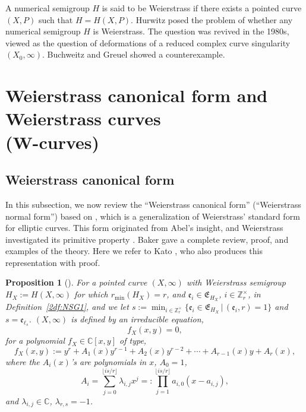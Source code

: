 \documentclass[pdftex]{sigma}
\def\CC{{\mathbb C}}
\def\ZZ{{\mathbb Z}}
\def\fE{{\mathfrak E}}
\def\fe{{\mathfrak e}}
\numberwithin{equation}{section}
\newtheorem{Proposition}[Theorem]{Proposition}
 { \theoremstyle{definition}
\newtheorem{Definition}[Theorem]{Definition}
\newtheorem{Note}[Theorem]{Note}
\newtheorem{Example}[Theorem]{Example}
\newtheorem{Remark}[Theorem]{Remark} }
\begin{document}
A numerical semigroup $H$ is said to be Weierstrass if there exists a pointed curve $(X, P)$ such that $H=H(X,P)$.
Hurwitz posed the problem of whether any numerical semigroup $H$ is Weierstrass.
The question was revived in the 1980s, viewed as the question of deformations of a reduced complex curve singularity $(X_0,\infty )$.
Buchweitz and Greuel showed a counterexample.

\section[Weierstrass canonical form and Weierstrass curves (W-curves)]{Weierstrass canonical form and Weierstrass curves\\ (W-curves)}\label{sec:WCF}

\subsection{Weierstrass canonical form}

In this subsection, we now review the ``Weierstrass canonical form'' (``Weierstrass normal form'') based on \cite{KM2020, KMP16, KMP19}, which is a generalization of Weierstrass' standard form for elliptic curves.
This form originated from Abel's insight, and Weierstrass investigated its primitive property \cite{Wei67, WeiWIV}.
Baker \cite[Chapter~V, Sections~60--79]{Baker97} gave a complete review, proof, and examples of the theory.
Here we refer to Kato \cite{CoppensKato, Kato80}, who also produces this representation with proof.

\begin{Proposition}[{\cite{CoppensKato, Kato80}}] \label{2pr:WCF}
For a pointed curve $(X,\infty )$ with Weierstrass semigroup $H_X:=H(X,\infty)$
for which $r_{\min}(H_X)=r$, and $\fe_i\in \fE_{H_X}$, $i \in \ZZ_r^\times$, in Definition~{\rm \ref{2df:NSG1}}, and we let
$s:=\min_{i\in \ZZ_r^\times}\{\fe_i \in \fE_{H_X}\, |\, (\fe_i, r)=1\}$ and $s=\fe_{\ell_s}$. $(X,\infty)$ is defined by an irreducible equation,
\begin{equation}
f_X(x,y)= 0,
\label{2eq:WCF1a}
\end{equation}
for a polynomial $f_X\in \CC[x,y]$ of type,
\begin{equation}
f_X(x,y):=y^r + A_{1}(x) y^{r-1}
+ A_{2}(x) y^{r-2}
+\cdots + A_{r-1}(x) y
 + A_{r}(x),
\label{2eq:WCF1b}
\end{equation}
where the $A_i(x)$'s are polynomials in $x$, $A_0=1$,
\begin{equation*}
A_i = \sum_{j=0}^{\lfloor i s/r\rfloor} \lambda_{i, j} x^j=:\prod_{j=1}^{\lfloor i s/r\rfloor}a_{i,0}(x-a_{i,j}),%
\end{equation*}
and $\lambda_{i,j} \in \CC$, $\lambda_{r,s}=-1$.
\end{Proposition}
\end{document}
